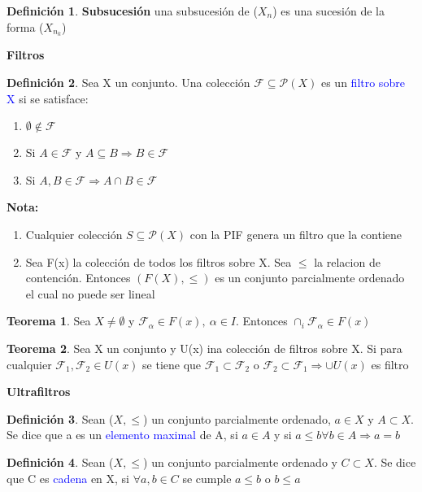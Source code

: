 \documentclass{article}
\theoremstyle{definition}
\newtheorem{definition}{Definición}[section]
\newtheorem{theorem}{Teorema}[section]
\begin{document}
\begin{definition}
	\textbf{Subsucesión } una subsucesión de ($X_n$) es una sucesión de la forma ($X_{n_k}$)
\end{definition}
\begin{LARGE}
	\textbf{Filtros}
\end{LARGE}
\begin{definition}
	Sea X un conjunto. Una colección $\mathcal{F}\subseteq \mathcal{P}(X)$ es un \textcolor{blue}{filtro sobre X} si se satisface:
	\begin{enumerate}
		\item $\emptyset\not\in \mathcal{F}$
		\item Si $A\in \mathcal{F}$ y $A\subseteq B\Rightarrow B\in \mathcal{F}$
		\item Si $A,B\in\mathcal{F}\Rightarrow A\cap B\in \mathcal{F}$
	\end{enumerate}	 
\end{definition}
\textbf{Nota: }
\begin{enumerate}
	\item Cualquier colección $S\subseteq \mathcal{P}(X)$ con la PIF genera un filtro que la contiene
	\item Sea F(x) la colección de todos los filtros sobre X. Sea $\leq$ la relacion de contención. Entonces $(F(X),\leq)$ es un conjunto parcialmente ordenado el cual no puede ser lineal
\end{enumerate}
\begin{theorem}
	Sea $X\neq\emptyset$ y $\mathcal{F}_{\alpha}\in F(x),\ \alpha\in I$. Entonces $\cap_i\mathcal{F}_{\alpha}\in F(x)$
\end{theorem}
\begin{theorem}
	Sea X un conjunto y U(x) ina colección de filtros sobre X. Si para cualquier $\mathcal{F}_1,\mathcal{F}_2\in U(x)$ se tiene que $\mathcal{F}_1\subset\mathcal{F}_2$ o $\mathcal{F}_2\subset\mathcal{F}_1\Rightarrow \cup U(x)$ es filtro
\end{theorem}
\begin{LARGE}
	\textbf{Ultrafiltros}
\end{LARGE}
\begin{definition}
	Sean ($X,\leq$) un conjunto parcialmente ordenado, $a\in X$ y $A\subset X$. Se dice que a es un \textcolor{blue}{elemento maximal} de A, si $a\in A$ y si $a\leq b\forall b\in A\Rightarrow a=b$
\end{definition}
\begin{definition}
	Sean ($X,\leq$) un conjunto parcialmente ordenado y $C\subset X$. Se dice que C es \textcolor{blue}{cadena} en X, si $\forall a,b\in C$ se cumple $a\leq b$ o $b\leq a$
\end{definition}
\end{document}
